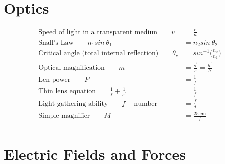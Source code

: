 \documentclass[]{article}
\begin{document}
\newpage



\section{Optics}

\begin{align*}
	\text{Speed of light in a transparent mediun} \qquad v &= \frac{c}{n} \\
	\text{Snall's Law} \qquad n_1 sin \ \theta_1  &= n_2 sin \ \theta_2 \\
	\text{Critical angle (total internal reflection)} \qquad \theta_c &= sin^{-1} \Big( \frac{n_2}{n_1} \Big) \\
	\text{Optical magnification} \qquad m &= \frac{s^{'}}{s} = \frac{h^{'}}{h}\\
	\text{Len power} \qquad P &= \frac{1}{f} \\
	\text{Thin lens equation} \qquad \frac{1}{s} + \frac{1}{s^{'}} &= \frac{1}{f} \\
	\text{Light gathering ability} \qquad f - \text{number} &= \frac{f}{d} \\
	\text{Simple magnifier} \qquad M &= \frac{25 \  \text{cm}}{f} \\
\end{align*}

\newpage



\section{Electric Fields and Forces}
\end{document}
